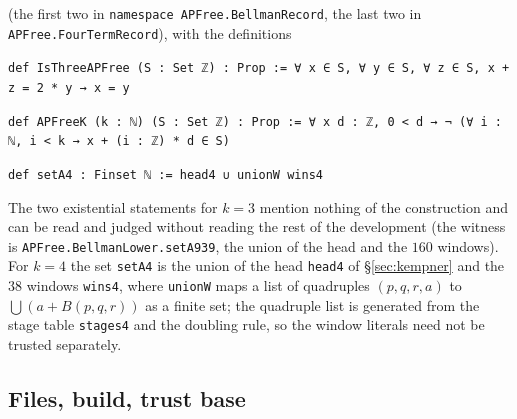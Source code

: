 \documentclass[11pt,a4paper]{article}
\theoremstyle{definition}
\theoremstyle{remark}
\newcommand{\Blk}{B}
\newcommand{\code}[1]{\texttt{#1}}
\begin{document}
(the first two in \code{namespace APFree.\allowbreak{}BellmanRecord}, the last two in \code{APFree.\allowbreak{}FourTermRecord}), with the definitions

\begin{leancode}
\item \code{def IsThreeAPFree (S : Set ℤ) : Prop := ∀ x ∈ S, ∀ y ∈ S, ∀ z ∈ S, x + z = 2 * y → x = y}
\item \code{def APFreeK (k : ℕ) (S : Set ℤ) : Prop := ∀ x d : ℤ, 0 < d → ¬ (∀ i : ℕ, i < k → x + (i : ℤ) * d ∈ S)}
\item \code{def setA4 : Finset ℕ := head4 ∪ unionW wins4}
\end{leancode}

The two existential statements for $k=3$ mention nothing of the construction and can be read and judged without reading the rest of the development (the witness is \code{APFree.\allowbreak{}BellmanLower.\allowbreak{}setA939}, the union of the head and the $160$ windows). For $k=4$ the set \code{setA4} is the union of the head \code{head4} of \S\ref{sec:kempner} and the $38$ windows \code{wins4}, where \code{unionW} maps a list of quadruples $(p,q,r,a)$ to $\bigcup (a + \Blk(p,q,r))$ as a finite set; the quadruple list is generated from the stage table \code{stages4} and the doubling rule, so the window literals need not be trusted separately.

\subsection{Files, build, trust base}\label{sec:files}
\end{document}
